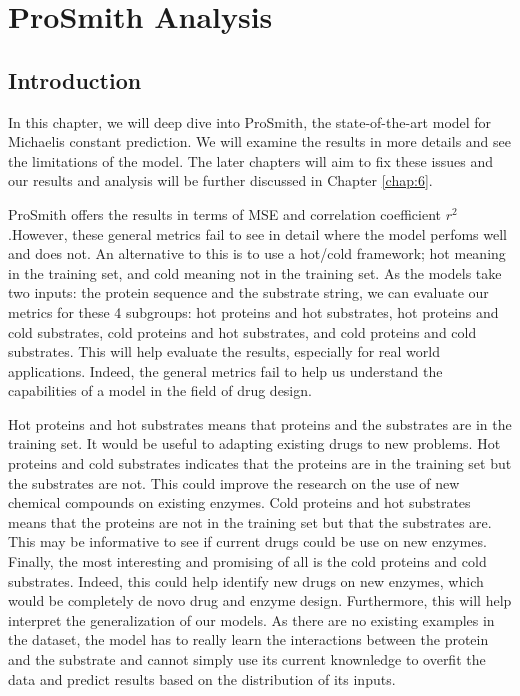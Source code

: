
\chapter{ProSmith Analysis}
\label{chap:2}

\section{Introduction}

In this chapter, we will deep dive into ProSmith, the state-of-the-art model for Michaelis constant
prediction. We will examine the results in more details and see the limitations of the model. The later
chapters will aim to fix these issues and our results and analysis will be further discussed in 
Chapter \ref{chap:6}.

ProSmith offers the results in terms of MSE and correlation coefficient $r^2$.However, 
these general metrics fail to see in detail where the model perfoms well and does not. An
alternative to this is to use a hot/cold framework; hot meaning in the training set, and cold 
meaning not in the training set. As the models take two inputs: the protein sequence and 
the substrate string, we can evaluate our metrics for these 4 subgroups: hot proteins and hot substrates, 
hot proteins and cold substrates, cold proteins and hot substrates, and cold proteins and cold substrates. 
This will help evaluate the results,
especially for real world applications. Indeed, the general metrics fail to help us understand the 
capabilities of a model in the field of drug design.

Hot proteins and hot substrates means that proteins and the substrates are in the training set. It would
be useful to adapting existing drugs to new problems. Hot proteins and cold substrates indicates that
the proteins are in the training set but the substrates are not. This could improve the research on the
use of new chemical compounds on existing enzymes. Cold proteins and hot substrates means that the proteins
are not in the training set but that the substrates are. This may be informative to see if current drugs 
could be use on new enzymes. Finally, the most interesting and promising of all is the cold proteins
and cold substrates. Indeed, this could help identify new drugs on new enzymes, which would be completely
de novo drug and enzyme design. Furthermore, this will help interpret the generalization of our models. As
there are no existing examples in the dataset, the model has to really learn the interactions between the
protein and the substrate and cannot simply use its current knownledge to overfit the data and predict
results based on the distribution of its inputs.

